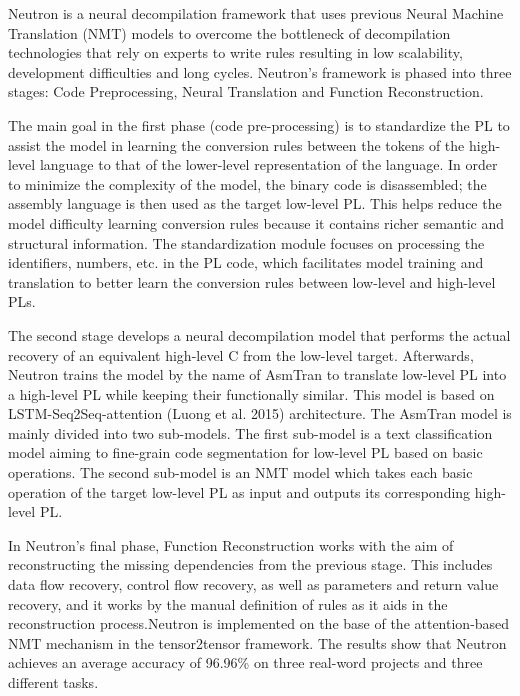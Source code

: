 \documentclass[conference,a4paper]{IEEEtran}
\begin{document}
Neutron is a neural decompilation framework that uses previous Neural Machine Translation (NMT) models to overcome the bottleneck of decompilation technologies that rely on experts to write rules resulting in low scalability, development difficulties and long cycles.
Neutron’s framework is phased into three stages: Code Preprocessing, Neural Translation and Function Reconstruction.

The main goal in the first phase (code pre-processing) is to standardize the PL to assist the model in learning the conversion rules between the tokens of the high-level language to that of the lower-level representation of the language.
In order to minimize the complexity of the model, the binary code is disassembled; the assembly language is then used as the target low-level PL.
This helps reduce the model difficulty learning conversion rules because it contains richer semantic and structural information.
The standardization module focuses on processing the identifiers, numbers, etc. in the PL code, which facilitates model training and translation to better learn the conversion rules between low-level and high-level PLs.

The second stage develops a neural decompilation model that performs the actual recovery of an equivalent high-level C from the low-level target.
Afterwards, Neutron trains the model by the name of AsmTran to translate low-level PL into a high-level PL while keeping their functionally similar.
This model is based on LSTM-Seq2Seq-attention (Luong et al. 2015) architecture.
The AsmTran model is mainly divided into two sub-models.
The first sub-model is a text classification model aiming to fine-grain code segmentation for low-level PL based on basic operations.
The second sub-model is an NMT model which takes each basic operation of the target low-level PL as input and outputs its corresponding high-level PL.

In Neutron’s final phase, Function Reconstruction works with the aim of reconstructing the missing dependencies from the previous stage.
This includes data flow recovery, control flow recovery, as well as parameters and return value recovery, and it works by the manual definition of rules as it aids in the reconstruction process.Neutron is implemented on the base of the attention-based NMT mechanism in the tensor2tensor framework. The results show that Neutron achieves an average accuracy of 96.96\% on three real-word projects and three different tasks.
\end{document}
